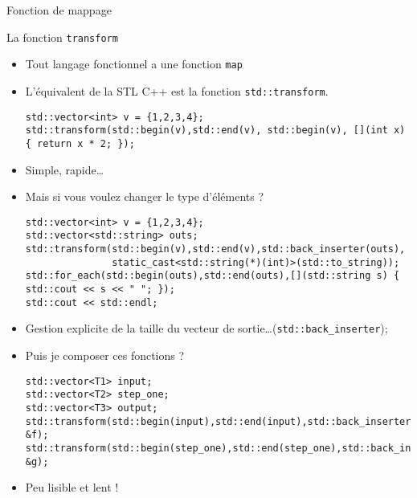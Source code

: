 \documentclass[handout,10pt]{beamer}
\begin{document}
\begin{frame}[fragile]{Fonction de mappage}
\tiny
\begin{block}{La fonction \lstinline$transform$}
 \begin{itemize}
  \item Tout langage fonctionnel a une fonction \lstinline$map$
  \item L'équivalent de la STL C++ est la fonction \lstinline$std::transform$.
\begin{lstlisting}
std::vector<int> v = {1,2,3,4};
std::transform(std::begin(v),std::end(v), std::begin(v), [](int x) { return x * 2; });
\end{lstlisting}
  \item Simple, rapide\ldots
  \item \alert{Mais si vous voulez changer le type d'éléments} ?
\begin{lstlisting}
std::vector<int> v = {1,2,3,4};
std::vector<std::string> outs;
std::transform(std::begin(v),std::end(v),std::back_inserter(outs), 
               static_cast<std::string(*)(int)>(std::to_string));
std::for_each(std::begin(outs),std::end(outs),[](std::string s) { std::cout << s << " "; });
std::cout << std::endl;
\end{lstlisting}  
  \item Gestion explicite de la taille du vecteur de sortie\ldots (\lstinline$std::back_inserter$);
  \item \alert{Puis je composer ces fonctions} ?
\begin{lstlisting}
std::vector<T1> input;
std::vector<T2> step_one;
std::vector<T3> output;
std::transform(std::begin(input),std::end(input),std::back_inserter(step_one), &f);
std::transform(std::begin(step_one),std::end(step_one),std::back_inserter(output), &g);
\end{lstlisting}
  \item Peu lisible et lent !
\end{itemize}
\end{block}
\end{frame}
\end{document}
